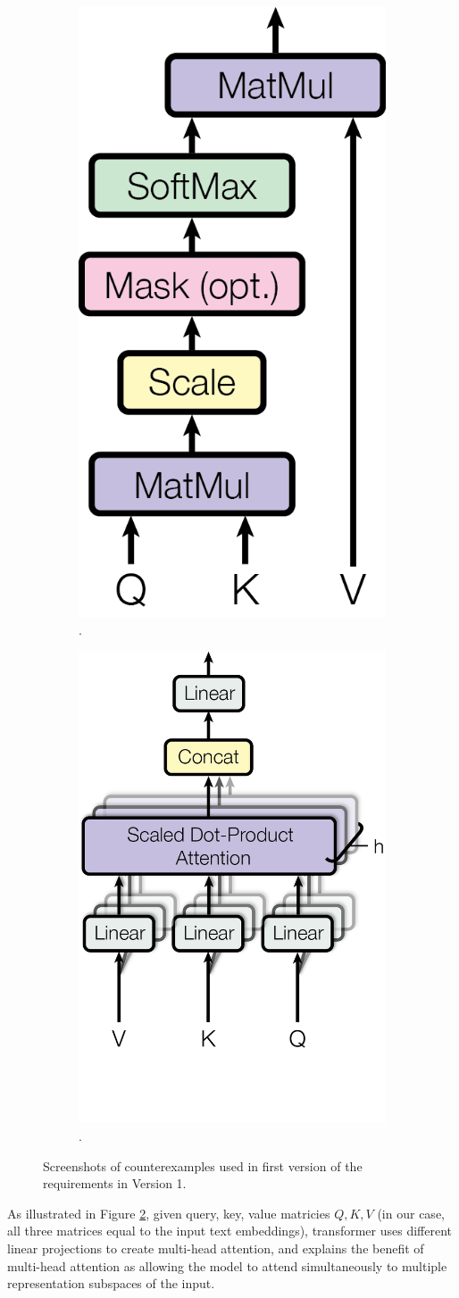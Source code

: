 \begin{figure}[!htb]
\begin{subfigure}{0.5\textwidth}
    \centering
    \includegraphics[width=.3\linewidth]{modeling/selfAttention.png}  
    \caption{.}
    \label{modeling.attention.dot}
\end{subfigure}
\begin{subfigure}{0.5\textwidth}
    \centering
    \includegraphics[width=.5\linewidth]{modeling/multiHeadAttention.png}  
    \caption{.}
    \label{modeling.attention.multihead}
\end{subfigure}
\caption{Screenshots of counterexamples used in first version of the requirements in Version 1.}
\label{modeling.attention}
\end{figure}

As illustrated in Figure \ref{modeling.attention.multihead}, given query, key, value matricies $Q,K,V$ (in our case, all three matrices equal to the input text embeddings), transformer uses different linear projections to create multi-head attention, and \citet{attentionAllYouNeed} explains the benefit of multi-head attention as allowing the model to attend simultaneously to multiple representation subspaces of the input.      

